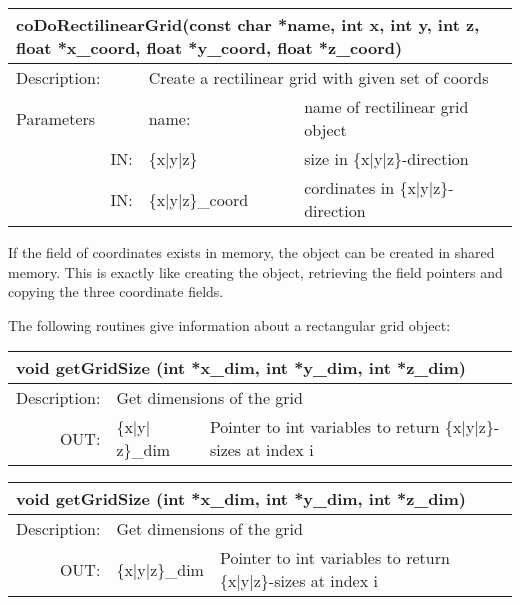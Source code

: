 \begin{htmlonly}
\begin{longtable}{|p{4cm}|p{2.5cm}|p{7cm}|}
\hline
\multicolumn{3}{|p{13.5cm}|}{\bf  coDoRectilinearGrid(const char *name, int x, int y, int z, 
float *x\_coord, float *y\_coord, float *z\_coord)}\\
\hline
{Description:}  
           & \multicolumn{2}{p{9.5cm}|}{Create a rectilinear grid with given set of coords} \\
\hline
{Parameters} & \multicolumn{1}{p{3cm}|}{name:} 
                          & \multicolumn{1}{p{5cm}|}{name of rectilinear grid object}\\
\hline
\multicolumn{1}{|r|}{IN:} & \multicolumn{1}{p{3cm}|}{\{x|y|z\}} 
                          & \multicolumn{1}{p{5cm}|}{size in 
			  \{x|y|z\}-direction}\\
\hline
\multicolumn{1}{|r|}{IN:} & \multicolumn{1}{p{3cm}|}{\{x|y|z\}\_coord} 
                          & \multicolumn{1}{p{5cm}|}{cordinates in 
			  \{x|y|z\}-direction}\endhead
\hline
\end{longtable}
\end{htmlonly}

If the field of coordinates exists in memory, the object can be created in 
shared memory. This is exactly like creating the object, retrieving the field
pointers and copying the three coordinate fields.

The following routines give information about a rectangular grid object:

\latexonly
\begin{longtable}{|p{4cm}|p{2.5cm}|p{7cm}|}
\hline
\multicolumn{3}{|p{13.5cm}|}{\bf void getGridSize \newline
           (int *x\_dim, int *y\_dim, int *z\_dim)}\\
\hline
{Description:}  
           & \multicolumn{2}{p{9.5cm}|}{Get dimensions of the grid} \\
\hline
\multicolumn{1}{|r|}{OUT:} & \multicolumn{1}{p{3cm}|}{\{x$\mid$y$\mid$z\}\_dim} 
                          & \multicolumn{1}{p{5cm}|}{Pointer to int variables 
			  to return \{x$\mid$y$\mid$z\}-sizes at index i}\endhead
\hline
\end{longtable}
\endlatexonly

\begin{htmlonly}
\begin{longtable}{|p{4cm}|p{2.5cm}|p{7cm}|}
\hline
\multicolumn{3}{|p{13.5cm}|}{\bf void getGridSize \newline
           (int *x\_dim, int *y\_dim, int *z\_dim)}\\
\hline
{Description:}  
           & \multicolumn{2}{p{9.5cm}|}{Get dimensions of the grid} \\
\hline
\multicolumn{1}{|r|}{OUT:} & \multicolumn{1}{p{3cm}|}{\{x|y|z\}\_dim} 
                          & \multicolumn{1}{p{5cm}|}{Pointer to int variables 
			  to return \{x|y|z\}-sizes at index i}\endhead
\hline
\end{longtable}
\end{htmlonly}

